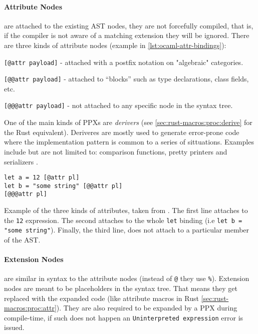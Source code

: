 \paragraph{Attribute Nodes} are attached to the existing AST nodes,
they are not forcefully compiled, that is, if the compiler is not aware of a matching extension they will be ignored.
There are three kinds of attribute nodes (example in \autoref{lst:ocaml-attr-bindings}):
\begin{displayquote}
    \begin{compactitem}
        \item \texttt{[@attr payload]} - attached with a postfix notation on "algebraic" categories.
        \item \texttt{[@@attr payload]} - attached to “blocks” such as type declarations, class fields, etc.
        \item \texttt{[@@@attr payload]} - not attached to any specific node in the syntax tree.
    \end{compactitem}
\end{displayquote}

One of the main kinds of PPXs are \emph{derivers} (see \autoref{sec:rust-macros:proc:derive} for the Rust equivalent).
Deriveres are mostly used to generate error-prone code where the implementation pattern is common to a series of sittuations.
Examples include but are not limited to: comparison functions, pretty printers and serializers \autocite{Rebours2019}.

\begin{listing}
    \begin{verbatim}
let a = 12 [@attr pl]
let b = "some string" [@@attr pl]
[@@@attr pl]
    \end{verbatim}
    \caption{
        Example of the three kinds of attributes, taken from \autocite{Rebours2019}.
        The first line attaches to the \texttt{12} expression.
        The second attaches to the whole \texttt{let} binding (i.e \texttt{let b = "some string"}).
        Finally, the third line, does not attach to a particular member of the AST.
    }
    \label{lst:ocaml-attr-bindings}
\end{listing}

\paragraph{Extension Nodes} are similar in syntax to the attribute nodes (instead of \texttt{@} they use \texttt{\%}).
Extension nodes are meant to be placeholders in the syntax tree.
That means they get replaced with the expanded code (like attribute macros in Rust \autoref{sec:rust-macros:proc:attr}).
They are also required to be expanded by a PPX during compile-time,
if such does not happen an \texttt{Uninterpreted expression} error is issued.

